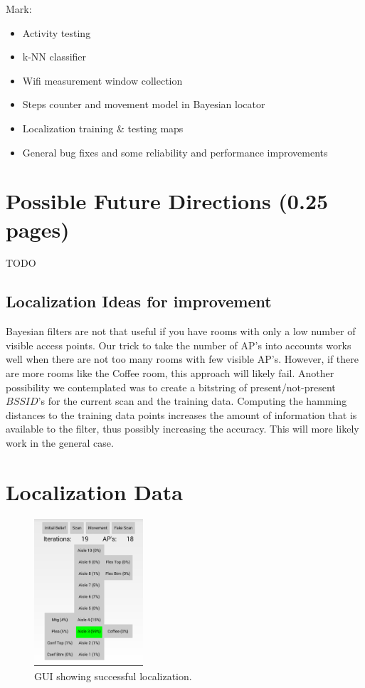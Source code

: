 \documentclass[a4paper,10pt,twoside]{IEEEtran}
\begin{document}
Mark:
\begin{itemize}
    \item Activity testing
    \item k-NN classifier
    \item Wifi measurement window collection
    \item Steps counter and movement model in Bayesian locator
    \item Localization training \& testing maps
    \item General bug fixes and some reliability and performance improvements
\end{itemize}

\section{Possible Future Directions (0.25 pages)}
\label{sec:future-directions}
TODO

\subsection{Localization Ideas for improvement}
Bayesian filters are not that useful if you have rooms with only a low number of visible access points.
Our trick to take the number of AP's into accounts works well when there
are not too many rooms with few visible AP's.
However, if there are more rooms like the Coffee room, this approach will likely fail.
Another possibility we contemplated was to create a bitstring of present/not-present $BSSID$'s for the current scan and the training data.
Computing the hamming distances to the training data points increases the amount of information that
is available to the filter, thus possibly increasing the accuracy.
This will more likely work in the general case.

%
%

\newpage
\appendix

%
\section{Localization Data}

\begin{figure}[h!]
  \centering
    \includegraphics[width=0.36\textwidth]{screenshot}
    \caption{GUI showing successful localization.}
    \label{fig:screenshot}
\end{figure}
\end{document}
